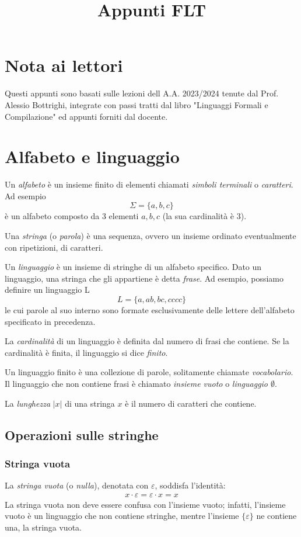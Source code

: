 \documentclass[11pt]{article}
\title{Appunti FLT}
\begin{document}
\section*{Nota ai lettori}
Questi appunti sono basati sulle lezioni dell A.A. 2023/2024 tenute dal Prof. Alessio Bottrighi, integrate con passi tratti 
dal libro "Linguaggi Formali e Compilazione" ed appunti forniti dal docente.
\section{Alfabeto e linguaggio}
Un \textit{alfabeto} è un insieme finito di elementi chiamati \textit{simboli terminali} o \textit{caratteri}. Ad esempio 
\begin{equation*}
    \Sigma=\{a,b,c\}
\end{equation*}
è un alfabeto composto da 3 elementi $a,b,c$ (la sua cardinalità è 3). 

Una \textit{stringa} (o \textit{parola}) è una sequenza, ovvero un insieme ordinato eventualmente con ripetizioni, di caratteri.

Un \textit{linguaggio} è un insieme di stringhe di un alfabeto specifico. Dato un linguaggio, una stringa che gli appartiene 
è detta \textit{frase}. Ad esempio, possiamo definire un linguaggio L 
\begin{equation*}
    L=\{a,ab,bc,cccc\}
\end{equation*}
le cui parole al suo interno sono formate esclusivamente delle lettere dell'alfabeto specificato in precedenza.

La \textit{cardinalità} di un linguaggio è definita dal numero di frasi che contiene. Se la cardinalità è finita, il linguaggio 
si dice \textit{finito}. 

Un linguaggio finito è una collezione di parole, solitamente chiamate \textit{vocabolario}. Il linguaggio che non contiene 
frasi è chiamato \textit{insieme vuoto} o \textit{linguaggio $\emptyset$}.

La \textit{lunghezza} $|x|$ di una stringa $x$ è il numero di caratteri che contiene.
\subsection{Operazioni sulle stringhe}
\subsubsection*{Stringa vuota}
La \textit{stringa vuota} (o \textit{nulla}), denotata con $\varepsilon$, soddisfa l'identità:
\begin{align*}
    x\cdot \varepsilon=\varepsilon \cdot x = x
\end{align*}
La stringa vuota non deve essere confusa con l'insieme vuoto; infatti, l'insieme vuoto è un linguaggio che non contiene 
stringhe, mentre l'insieme $\{\varepsilon\}$ ne contiene una, la stringa vuota.
\end{document}
